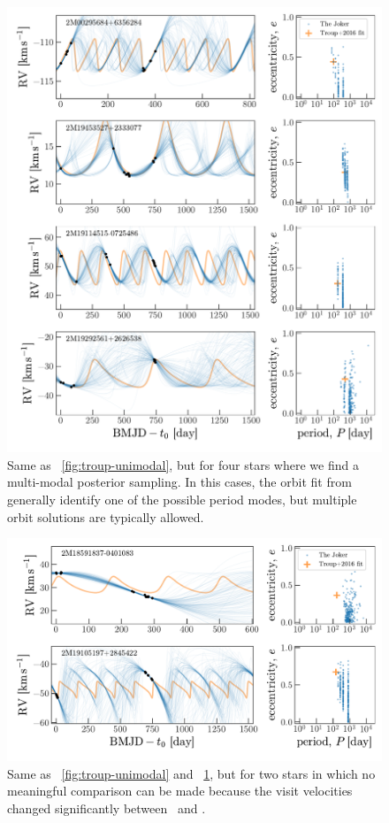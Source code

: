\documentclass[modern, letterpaper]{aastex62}
\newcommand{\DR}{\acronym{DR14}}
\newcommand{\DRtw}{\acronym{DR12}}
\begin{document}
\begin{figure}[h]
\begin{center}
\includegraphics[width=\textwidth]{troup-multimodal.pdf}
\end{center}
\caption{%
Same as \figurename~\ref{fig:troup-unimodal}, but for four stars where we find a
multi-modal posterior sampling.
In this cases, the orbit fit from \citet{Troup:2016} generally identify one of
the possible period modes, but multiple orbit solutions are typically allowed.
\label{fig:troup-multimodal}
}
\end{figure}

\begin{figure}[h]
\begin{center}
\includegraphics[width=\textwidth]{troup-data-changed.pdf}
\end{center}
\caption{%
Same as \figurename~\ref{fig:troup-unimodal} and
\figurename~\ref{fig:troup-multimodal}, but for two stars in which no meaningful
comparison can be made because the visit velocities changed significantly
between \DRtw\ and \DR.
\label{fig:troup-datachanged}
}
\end{figure}
\end{document}
